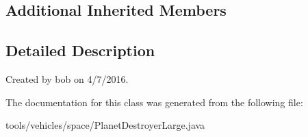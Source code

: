 \subsection*{Additional Inherited Members}


\subsection{Detailed Description}
Created by bob on 4/7/2016. 

The documentation for this class was generated from the following file\+:\begin{DoxyCompactItemize}
\item 
tools/vehicles/space/Planet\+Destroyer\+Large.\+java\end{DoxyCompactItemize}
